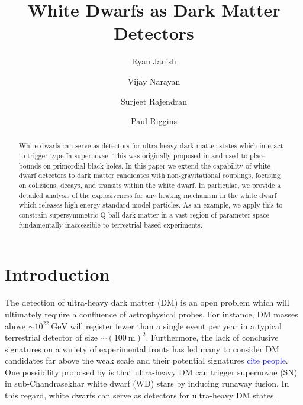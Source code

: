 \documentclass[twocolumn,showpacs,preprintnumbers,amsmath,amssymb,prd]{revtex4}
\newcommand{\GeV}{\text{GeV}}
\begin{document}
\title{White Dwarfs as Dark Matter Detectors}

\author{Ryan Janish}

\author{Vijay Narayan}

\author{Surjeet Rajendran}

\author{Paul Riggins}

\begin{abstract}

White dwarfs can serve as detectors for ultra-heavy dark matter states which interact to trigger type Ia supernovae.
This was originally proposed in \cite{Graham:2015apa} and used to  place bounds on primordial black holes.
In this paper we extend the capability of white dwarf detectors to dark matter candidates with non-gravitational couplings, focusing on collisions, decays, and transits within the white dwarf.
In particular, we provide a detailed analysis of the explosiveness for any heating mechanism in the white dwarf which releases high-energy standard model particles.
As an example, we apply this to constrain supersymmetric Q-ball dark matter in a vast region of parameter space fundamentally inaccessible to terrestrial-based experiments.


\end{abstract}
\maketitle


\section{Introduction}
\label{sec:Introduction}

The detection of ultra-heavy dark matter (DM) is an open problem which will ultimately require a confluence of astrophysical probes.
For instance, DM masses above $\sim 10^{22} ~\GeV$ will register fewer than a single event per year in a typical terrestrial detector of size $\sim (100 ~\text{m})^2$.
Furthermore, the lack of conclusive signatures on a variety of experimental fronts has led many to consider DM candidates far above the weak scale and their potential signatures \textcolor{blue}{cite people}.
One possibility proposed by \cite{Graham:2015apa} is that ultra-heavy DM can trigger supernovae (SN) in sub-Chandrasekhar white dwarf (WD) stars by inducing runaway fusion.
In this regard, white dwarfs can serve as detectors for ultra-heavy DM states.
\end{document}
